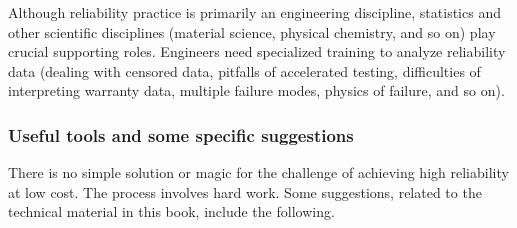 Although reliability practice is primarily an engineering
discipline, statistics and other scientific disciplines (material
science, physical chemistry, and so on) play crucial supporting
roles.  Engineers need specialized training to analyze reliability
data (dealing with censored data, pitfalls of accelerated testing,
difficulties of interpreting warranty data, multiple failure modes,
physics of failure, and so on).

\subsubsection{\bf Useful tools and some specific suggestions}
There is no simple solution or magic for the challenge of achieving
high reliability at low cost. The process involves hard work. Some
suggestions, related to the technical material in this book, include
the following.
